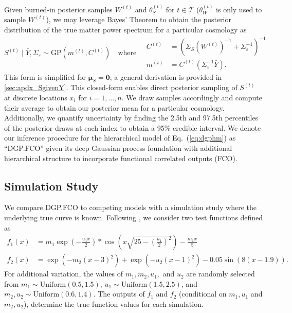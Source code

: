 \documentclass[11pt]{article}
\begin{document}
Given burned-in posterior samples $W^{(t)}$ and $\theta_S^{(t)}$
for $t\in\mathcal{T}$ ($\theta_W^{(t)}$ is only used to sample $W^{(t)}$), 
we may leverage Bayes' Theorem to obtain the
posterior distribution of the true matter power spectrum for a particular cosmology as
\[
S^{(t)}\mid\bar{Y}, \Sigma_\varepsilon \sim \mathrm{GP}(m^{(t)}, C^{(t)})
\quad\textrm{where}\quad
\begin{array}{rl}
C^{(t)}&=\left(\Sigma_S(W^{(t)})^{-1}+\Sigma_\varepsilon^{-1}\right)^{-1} \\
m^{(t)}&=C^{(t)}\left(\Sigma_\varepsilon^{-1}\bar{Y}\right).
\end{array}
\] 
This form is simplified for $\boldsymbol{\mu}_S=\mathbf{0}$; a general derivation 
is provided in \ref{sec:apdx_SgivenY}.  This closed-form enables direct posterior
sampling of $S^{(t)}$ at discrete locations $x_i$ for $i=1,\dots, n$.  
We draw samples accordingly and compute their average 
to obtain our posterior mean for a particular cosmology. 
Additionally, we quantify uncertainty by finding the 2.5th and 97.5th percentiles 
of the posterior draws at each index to obtain a 95\% credible interval.
We denote our inference procedure for the hierarchical model of Eq.~(\ref{eq:dgphm}) as
``DGP.FCO'' given its deep Gaussian process foundation with additional hierarchical
structure to incorporate functional correlated outputs (FCO).

\subsection{Simulation Study}
\label{subsec:sim}

We compare DGP.FCO to competing models with a simulation study where the underlying 
true curve is known. Following \cite{moran2023mira}, we consider two test functions 
defined as
\[
\begin{aligned}
  f_1(x) &= m_1 \exp\left(-\frac{u_1x}{2}\right) * 
  \cos\left(x\sqrt{25-\left(\frac{u_1}{2}\right)^2}\right) - \frac{m_1x}{5}\\
  f_2(x) &= \exp\left(-m_2(x-3)^2\right) + 
  \exp\left(-u_2(x-1)^2\right)-0.05\sin\left(8(x-1.9)\right).
\end{aligned}
\]
For additional variation, the values of $m_1, m_2, u_1,$ and $u_2$ are randomly selected from
$m_1 \sim \text{Uniform}(0.5,1.5)$, $u_1 \sim \text{Uniform}(1.5,2.5)$, and $m_2,u_2 
\sim \text{Uniform}(0.6,1.4)$. The outputs of $f_1$ and $f_2$ (conditional on $m_1,u_1$ and 
$m_2,u_2$), determine the true function values for each simulation.
      
\end{document}
